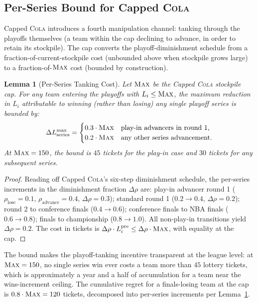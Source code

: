 \documentclass{article}
\newtheorem{lemma}[theorem]{Lemma}
\newcommand{\cola}{\textup{\textsc{Cola}}}
\newcommand{\Max}{\textup{\textsc{Max}}}
\begin{document}
\subsection{Per-Series Bound for Capped \cola{}}

Capped \cola{} introduces a fourth manipulation channel: tanking through the playoffs themselves (a team within the cap declining to advance, in order to retain its stockpile). The cap converts the playoff-diminishment schedule from a fraction-of-current-stockpile cost (unbounded above when stockpile grows large) to a fraction-of-$\Max$ cost (bounded by construction).

\begin{lemma}[Per-Series Tanking Cost]
\label{lem:capped-bound}
Let $\Max$ be the Capped \cola{} stockpile cap. For any team entering the playoffs with $L_i \leq \Max$, the maximum reduction in $L_i$ attributable to winning (rather than losing) any single playoff series is bounded by:
\begin{equation*}
\Delta L_{\text{series}}^{\max} = \begin{cases}
0.3 \cdot \Max & \text{play-in advancers in round 1,} \\
0.2 \cdot \Max & \text{any other series advancement.}
\end{cases}
\end{equation*}
At $\Max = 150$, the bound is $45$ tickets for the play-in case and $30$ tickets for any subsequent series.
\end{lemma}

\begin{proof}
Reading off Capped \cola{}'s six-step diminishment schedule, the per-series increments in the diminishment fraction $\Delta\rho$ are: play-in advancer round 1 ($\rho_{\text{lose}} = 0.1$, $\rho_{\text{advance}} = 0.4$, $\Delta\rho = 0.3$); standard round 1 ($0.2 \to 0.4$, $\Delta\rho = 0.2$); round 2 to conference finals ($0.4 \to 0.6$); conference finals to NBA finals ($0.6 \to 0.8$); finals to championship ($0.8 \to 1.0$). All non-play-in transitions yield $\Delta\rho = 0.2$. The cost in tickets is $\Delta\rho \cdot L_i^{\text{pre}} \leq \Delta\rho \cdot \Max$, with equality at the cap.
\end{proof}

The bound makes the playoff-tanking incentive transparent at the league level: at $\Max = 150$, no single series win ever costs a team more than $45$ lottery tickets, which is approximately a year and a half of accumulation for a team near the wins-increment ceiling. The cumulative regret for a finals-losing team at the cap is $0.8 \cdot \Max = 120$ tickets, decomposed into per-series increments per Lemma~\ref{lem:capped-bound}.
\end{document}
